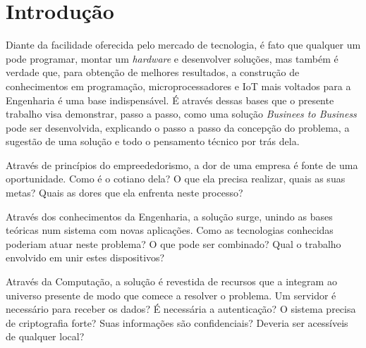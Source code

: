 \documentclass[
	12pt,				%
	openright,			%
	twoside,			%
	a4paper,			%
	english,			%
	french,				%
	spanish,			%
	brazil				%
	]{abntex2}
\begin{document}
\tableofcontents*
\newpage



\textual

\chapter*[Introdução]{Introdução}

Diante da facilidade oferecida pelo mercado de tecnologia, é fato que qualquer um pode programar, montar um \emph{hardware} e desenvolver soluções, mas também é verdade que, para obtenção de melhores resultados, a construção de conhecimentos em programação, microprocessadores e IoT mais voltados para a Engenharia é uma base indispensável. É através dessas bases que o presente trabalho visa demonstrar, passo a passo, como uma solução \emph{Businees to Business} pode ser desenvolvida, explicando o passo a passo da concepção do problema, a sugestão de uma solução e todo o pensamento técnico por trás dela.

Através de princípios do empreededorismo, a dor de uma empresa é fonte de uma oportunidade. Como é o cotiano dela? O que ela precisa realizar, quais as suas metas? Quais as dores que ela enfrenta neste processo?

Através dos conhecimentos da Engenharia, a solução surge, unindo as bases teóricas num sistema com novas aplicações. Como as tecnologias conhecidas poderiam atuar neste problema? O que pode ser combinado? Qual o trabalho envolvido em unir estes dispositivos?

Através da Computação, a solução é revestida de recursos que a integram ao universo presente de modo que comece a resolver o problema. Um servidor é necessário para receber os dados? É necessária a autenticação? O sistema precisa de criptografia forte? Suas informações são confidenciais? Deveria ser acessíveis de qualquer local?

\end{document}

